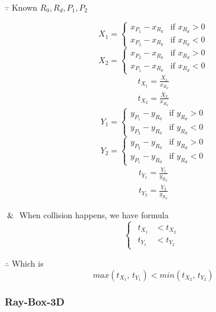 $\because$ Known $R_0$,\,$R_d$,\,$P_1$,\,$P_2$
\begin{multicols}{2}
\noindent
\[
X_1 =
\begin{cases}
x_{P_1} - x_{R_0} & \text{if } x_{R_d} > 0 \\
x_{P_2} - x_{R_0} & \text{if } x_{R_d} < 0
\end{cases}
\]
\[
X_2 =
\begin{cases}
x_{P_2} - x_{R_0} & \text{if } x_{R_d} > 0 \\
x_{P_1} - x_{R_0} & \text{if } x_{R_d} < 0
\end{cases}
\]
\[
\begin{array}{lr}
t_{X_1} = \frac{X_1}{x_{R_d}} \\
t_{X_2} = \frac{X_2}{x_{R_d}}
\end{array}
\]
\columnbreak
\[
Y_1 =
\begin{cases}
y_{P_1} - y_{R_0} & \text{if } y_{R_d} > 0 \\
y_{P_2} - y_{R_0} & \text{if } y_{R_d} < 0
\end{cases}
\]
\[
Y_2 =
\begin{cases}
y_{P_2} - y_{R_0} & \text{if } y_{R_d} > 0 \\
y_{P_1} - y_{R_0} & \text{if } y_{R_d} < 0
\end{cases}
\]
\[
\begin{array}{lr}
t_{Y_1} = \frac{Y_1}{y_{R_d}} \\
t_{Y_2} = \frac{Y_2}{y_{R_d}}
\end{array}
\]
\end{multicols}

$\And$ When collision happens,  we have formula
\[
\left\{
\begin{array}{lr}
\begin{aligned}
t_{X_1} &< t_{X_2} \\
t_{Y_1} &< t_{Y_2}
\end{aligned}
\end{array}
\right.
\]

$\therefore$ Which is
\begin{equation}\label{equ:ray-box-2d-intersection}
max(t_{X_1},\,t_{Y_1}) < min(t_{X_2},\,t_{Y_2})
\end{equation}

\subsubsection{Ray-Box-3D}

